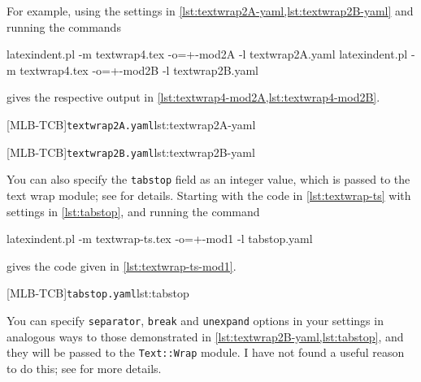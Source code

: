 	For example, using the settings in \cref{lst:textwrap2A-yaml,lst:textwrap2B-yaml} and
	running the commands
	\begin{commandshell}
latexindent.pl -m textwrap4.tex -o=+-mod2A -l textwrap2A.yaml
latexindent.pl -m textwrap4.tex -o=+-mod2B -l textwrap2B.yaml
\end{commandshell}
	gives the respective output in \cref{lst:textwrap4-mod2A,lst:textwrap4-mod2B}.

	\begin{cmhtcbraster}[raster column skip=.1\linewidth]
		[MLB-TCB]{\texttt{textwrap2A.yaml}}{lst:textwrap2A-yaml}

		[MLB-TCB]{\texttt{textwrap2B.yaml}}{lst:textwrap2B-yaml}
	\end{cmhtcbraster}

	You can also specify the \texttt{tabstop} field%
	 as an integer value, which is
	passed to the text wrap module; see \cite{textwrap} for details. Starting with the code
	in \cref{lst:textwrap-ts} with settings in \cref{lst:tabstop}, and running the command
	\begin{commandshell}
latexindent.pl -m textwrap-ts.tex -o=+-mod1 -l tabstop.yaml
\end{commandshell}
	gives the code given in \cref{lst:textwrap-ts-mod1}.
	\begin{cmhtcbraster}[raster columns=3,
			raster left skip=-3.5cm,
			raster right skip=-2cm,
			raster column skip=.03\linewidth]
		[MLB-TCB]{\texttt{tabstop.yaml}}{lst:tabstop}
	\end{cmhtcbraster}

	You can specify \texttt{separator}, \texttt{break} and \texttt{unexpand} options in your
	settings in analogous ways to those demonstrated in
	\cref{lst:textwrap2B-yaml,lst:tabstop}, and they will be passed to the
	\texttt{Text::Wrap} module. I have not found a useful reason to do this; see
	\cite{textwrap} for more details.

